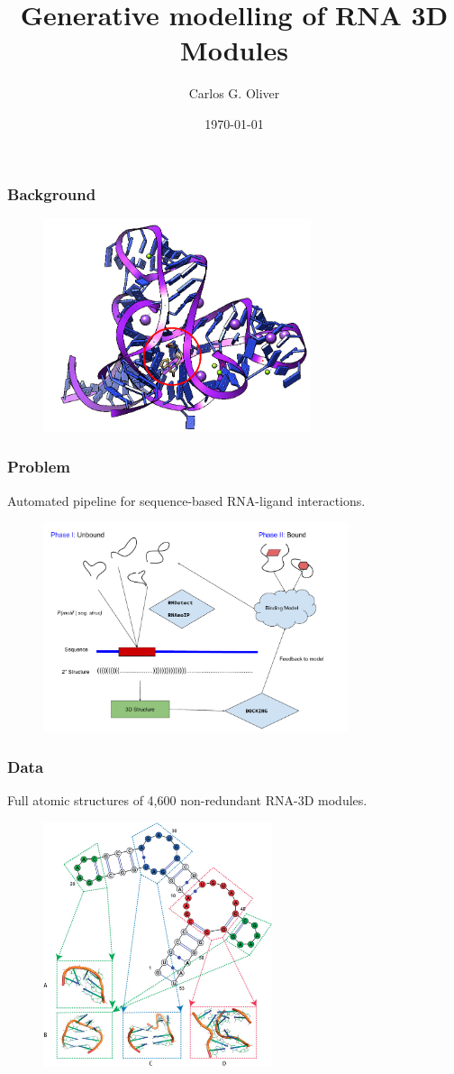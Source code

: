 \documentclass{beamer}
\title{Generative modelling of RNA 3D Modules}
\author{Carlos G. Oliver}
\date{\today}
\begin{document}
\frame{\titlepage}


\frame
{
	\frametitle{Background}
	
	\begin{figure}
		\includegraphics[width=0.7\textwidth]{riboswitch.png}
	\end{figure}
	

}


\frame
{
  \frametitle{Problem}
  
  Automated pipeline for sequence-based RNA-ligand interactions.
  
  \begin{figure}
  	\centering
	 \includegraphics[width=0.8\textwidth]{RiboCop_Diagram.pdf}
  \end{figure}

  }
  
  \frame
  {
  	\frametitle{Data}
	
	Full atomic structures of 4,600 non-redundant RNA-3D modules.
	
	\begin{figure}
		\includegraphics[width=0.6\textwidth]{motifs.jpeg}
	\end{figure}
  
  }
\end{document}
